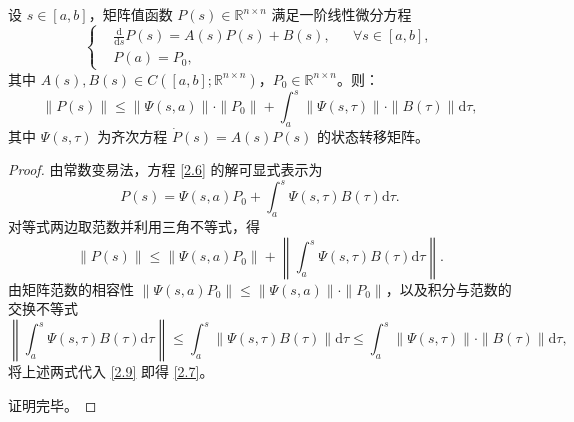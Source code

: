 \documentclass{GZUbachelorthesis}
\begin{document}
\vspace{1em}
\begin{lem}\label{lem2.2.1}
	设 $s\in[a,b]$，矩阵值函数 $P(s)\in \mathbb{R}^{n\times n}$ 满足一阶线性微分方程
	\begin{equation}\label{2.6}
		\left\{
		\begin{aligned}
			&\frac{\mathrm{d}}{\mathrm{d}s}P(s)= A(s)P(s)+B(s), &&\forall s\in[a,b],\\
			&P(a)=P_0,
		\end{aligned}
		\right.
	\end{equation}
	其中 $A(s), B(s)\in C([a,b];\mathbb{R}^{n\times n})$，$P_0\in \mathbb{R}^{n\times n}$。则：
	\begin{equation}\label{2.7}
		\|P(s)\|\leq \|\Psi(s,a)\|\cdot\|P_0\|+\int_{a}^{s}\|\Psi(s,\tau)\|\cdot\|B(\tau)\|\mathrm{d}\tau,
	\end{equation}
	其中 $\Psi(s,\tau)$ 为齐次方程 $\dot{P}(s)=A(s)P(s)$ 的状态转移矩阵。
\end{lem}
\begin{proof}
	由常数变易法，方程 \eqref{2.6} 的解可显式表示为
	\begin{equation}\label{2.8}
		P(s)=\Psi(s,a)P_0+\int_{a}^{s}\Psi(s,\tau)B(\tau)\mathrm{d}\tau.
	\end{equation}
	对等式两边取范数并利用三角不等式，得
	\begin{equation}\label{2.9}
		\|P(s)\|\leq\|\Psi(s,a)P_0\|+\left\|\int_{a}^{s}\Psi(s,\tau)B(\tau)\mathrm{d}\tau\right\|.
	\end{equation}
	由矩阵范数的相容性 $\|\Psi(s,a)P_0\|\leq\|\Psi(s,a)\|\cdot\|P_0\|$，以及积分与范数的交换不等式
	\begin{equation}\label{2.11}
		\left\|\int_{a}^{s}\Psi(s,\tau)B(\tau)\mathrm{d}\tau\right\|\leq\int_{a}^{s}\|\Psi(s,\tau)B(\tau)\|\mathrm{d}\tau\leq\int_{a}^{s}\|\Psi(s,\tau)\|\cdot\|B(\tau)\|\mathrm{d}\tau,
	\end{equation}
	将上述两式代入 \eqref{2.9} 即得 \eqref{2.7}。\par
	证明完毕。
\end{proof}
\end{document}
